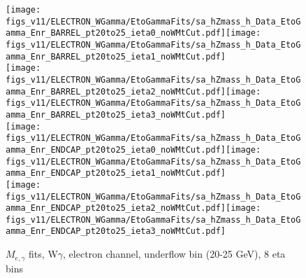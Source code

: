 \begin{figure}[htb]
  \begin{center}
   \texttt{[image: figs\_v11/ELECTRON\_WGamma/EtoGammaFits/sa\_hZmass\_h\_Data\_EtoGamma\_Enr\_BARREL\_pt20to25\_ieta0\_noWMtCut.pdf]}\texttt{[image: figs\_v11/ELECTRON\_WGamma/EtoGammaFits/sa\_hZmass\_h\_Data\_EtoGamma\_Enr\_BARREL\_pt20to25\_ieta1\_noWMtCut.pdf]}\\
   \texttt{[image: figs\_v11/ELECTRON\_WGamma/EtoGammaFits/sa\_hZmass\_h\_Data\_EtoGamma\_Enr\_BARREL\_pt20to25\_ieta2\_noWMtCut.pdf]}\texttt{[image: figs\_v11/ELECTRON\_WGamma/EtoGammaFits/sa\_hZmass\_h\_Data\_EtoGamma\_Enr\_BARREL\_pt20to25\_ieta3\_noWMtCut.pdf]}\\
   \texttt{[image: figs\_v11/ELECTRON\_WGamma/EtoGammaFits/sa\_hZmass\_h\_Data\_EtoGamma\_Enr\_ENDCAP\_pt20to25\_ieta0\_noWMtCut.pdf]}\texttt{[image: figs\_v11/ELECTRON\_WGamma/EtoGammaFits/sa\_hZmass\_h\_Data\_EtoGamma\_Enr\_ENDCAP\_pt20to25\_ieta1\_noWMtCut.pdf]}\\
   \texttt{[image: figs\_v11/ELECTRON\_WGamma/EtoGammaFits/sa\_hZmass\_h\_Data\_EtoGamma\_Enr\_ENDCAP\_pt20to25\_ieta2\_noWMtCut.pdf]}\texttt{[image: figs\_v11/ELECTRON\_WGamma/EtoGammaFits/sa\_hZmass\_h\_Data\_EtoGamma\_Enr\_ENDCAP\_pt20to25\_ieta3\_noWMtCut.pdf]}\\
  \label{fig:etogFits_20to25}
  \caption{$M_{e,\gamma}$ fits, W$\gamma$, electron channel, underflow bin (20-25 GeV), 8 eta bins}
  \end{center}
\end{figure}

